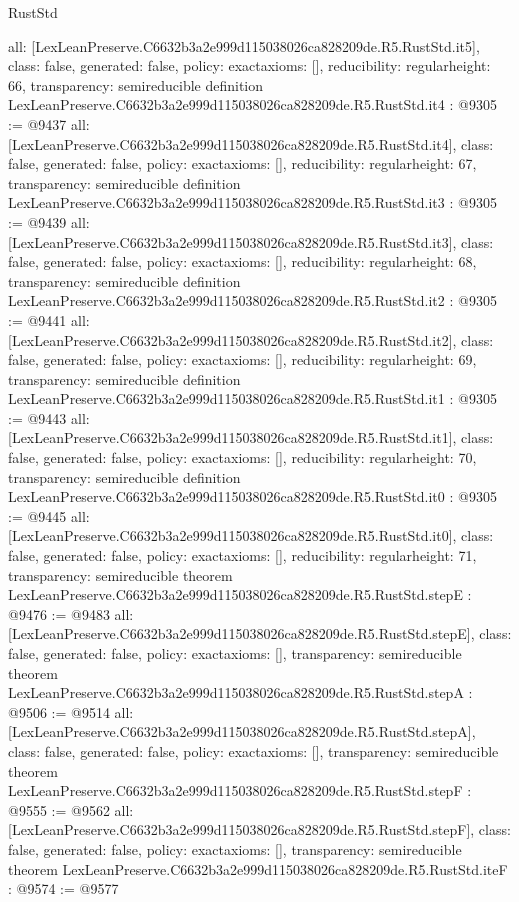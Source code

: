 \begin{lexlean}{RustStd}
\begin{coremodule}
{  all: [LexLeanPreserve.C6632b3a2e999d115038026ca828209de.R5.RustStd.it5],
  class: false,
  generated: false,
  policy: exact{axioms: []},
  reducibility: regular{height: 66},
  transparency: semireducible
}
definition LexLeanPreserve.C6632b3a2e999d115038026ca828209de.R5.RustStd.it4 : @9305 := @9437 {
  all: [LexLeanPreserve.C6632b3a2e999d115038026ca828209de.R5.RustStd.it4],
  class: false,
  generated: false,
  policy: exact{axioms: []},
  reducibility: regular{height: 67},
  transparency: semireducible
}
definition LexLeanPreserve.C6632b3a2e999d115038026ca828209de.R5.RustStd.it3 : @9305 := @9439 {
  all: [LexLeanPreserve.C6632b3a2e999d115038026ca828209de.R5.RustStd.it3],
  class: false,
  generated: false,
  policy: exact{axioms: []},
  reducibility: regular{height: 68},
  transparency: semireducible
}
definition LexLeanPreserve.C6632b3a2e999d115038026ca828209de.R5.RustStd.it2 : @9305 := @9441 {
  all: [LexLeanPreserve.C6632b3a2e999d115038026ca828209de.R5.RustStd.it2],
  class: false,
  generated: false,
  policy: exact{axioms: []},
  reducibility: regular{height: 69},
  transparency: semireducible
}
definition LexLeanPreserve.C6632b3a2e999d115038026ca828209de.R5.RustStd.it1 : @9305 := @9443 {
  all: [LexLeanPreserve.C6632b3a2e999d115038026ca828209de.R5.RustStd.it1],
  class: false,
  generated: false,
  policy: exact{axioms: []},
  reducibility: regular{height: 70},
  transparency: semireducible
}
definition LexLeanPreserve.C6632b3a2e999d115038026ca828209de.R5.RustStd.it0 : @9305 := @9445 {
  all: [LexLeanPreserve.C6632b3a2e999d115038026ca828209de.R5.RustStd.it0],
  class: false,
  generated: false,
  policy: exact{axioms: []},
  reducibility: regular{height: 71},
  transparency: semireducible
}
theorem LexLeanPreserve.C6632b3a2e999d115038026ca828209de.R5.RustStd.stepE : @9476 := @9483 {
  all: [LexLeanPreserve.C6632b3a2e999d115038026ca828209de.R5.RustStd.stepE],
  class: false,
  generated: false,
  policy: exact{axioms: []},
  transparency: semireducible
}
theorem LexLeanPreserve.C6632b3a2e999d115038026ca828209de.R5.RustStd.stepA : @9506 := @9514 {
  all: [LexLeanPreserve.C6632b3a2e999d115038026ca828209de.R5.RustStd.stepA],
  class: false,
  generated: false,
  policy: exact{axioms: []},
  transparency: semireducible
}
theorem LexLeanPreserve.C6632b3a2e999d115038026ca828209de.R5.RustStd.stepF : @9555 := @9562 {
  all: [LexLeanPreserve.C6632b3a2e999d115038026ca828209de.R5.RustStd.stepF],
  class: false,
  generated: false,
  policy: exact{axioms: []},
  transparency: semireducible
}
theorem LexLeanPreserve.C6632b3a2e999d115038026ca828209de.R5.RustStd.iteF : @9574 := @9577 {
}
\end{coremodule}
\end{lexlean}
